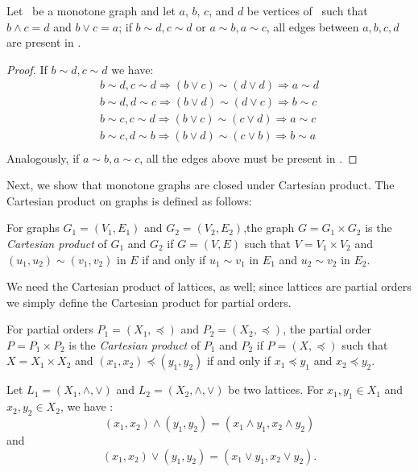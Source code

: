\begin{lemma}
Let \mG\ be a monotone graph and let
\(a\), \(b\), \(c\), and \(d\) be vertices of \mG\ such that \(b \wedge c = d\) and \(b \vee c = a\);
if \(b\sim d, c\sim d\) or \(a\sim b, a\sim c\), all edges between 
\(a, b, c, d\) are present in \mG\@.
\end{lemma}

\begin{proof}
If \(b\sim d, c\sim d\) we have:
\begin{eqnarray*}
b\sim d, c\sim d \Rightarrow (b \vee c) \sim (d \vee d) \Rightarrow a\sim d\\
b\sim d, d\sim c \Rightarrow (b \vee d) \sim (d \vee c) \Rightarrow b\sim c\\
b\sim c, c\sim d \Rightarrow (b \vee c) \sim (c \vee d) \Rightarrow a\sim c\\
b\sim c, d\sim b \Rightarrow (b \vee d) \sim (c \vee b) \Rightarrow b\sim a\\
\end{eqnarray*}
Analogously, if \(a\sim b, a\sim c\), all the edges above must be present in \mG\@.
\end{proof}

Next, we show that monotone graphs are closed under Cartesian product.
The Cartesian product on graphs is defined as follows:
\begin{defi} 
For graphs \(G_1=(V_1,E_1)\) and \(G_2=(V_2,E_2)\),the graph \(G = G_1 \times G_2\)
is the \emph{Cartesian product} of \(G_1\) and \(G_2\) if \(G=(V,E)\)
such that \(V=V_1 \times V_2\) and \((u_1,u_2)\sim (v_1,v_2)\) in \(E\)
if and only if \(u_1\sim v_1\) in \(E_1\) and \(u_2\sim v_2\) in \(E_2\)\@.
\end{defi}

We need the Cartesian product of lattices, as well;
since lattices are partial orders we simply define the Cartesian product
for partial orders.
\begin{defi} 
For partial orders \(P_1= (X_1,\preceq)\) and \(P_2=(X_2,\preceq)\), 
the partial order \(P= P_1 \times P_2\) is the \emph{Cartesian product} of \(P_1\) and \(P_2\)
if \(P=(X,\preceq)\) such that \(X=X_1\times X_2\) and \((x_1,x_2) \preceq (y_1,y_2)\)
if and only if \(x_1\preceq y_1\) and \(x_2\preceq y_2\)\@.
\end{defi}

\begin{rem}
Let \(L_1=(X_1,\wedge,\vee)\) and \(L_2=(X_2,\wedge,\vee)\) be two lattices.
For \(x_1,y_1 \in X_1\) and \(x_2,y_2\in X_2\), we have :
\[(x_1,x_2)\wedge (y_1,y_2) = (x_1\wedge y_1, x_2 \wedge y_2) \]
and \[(x_1,x_2)\vee (y_1,y_2) = (x_1\vee y_1, x_2 \vee y_2).\]
\end{rem}

